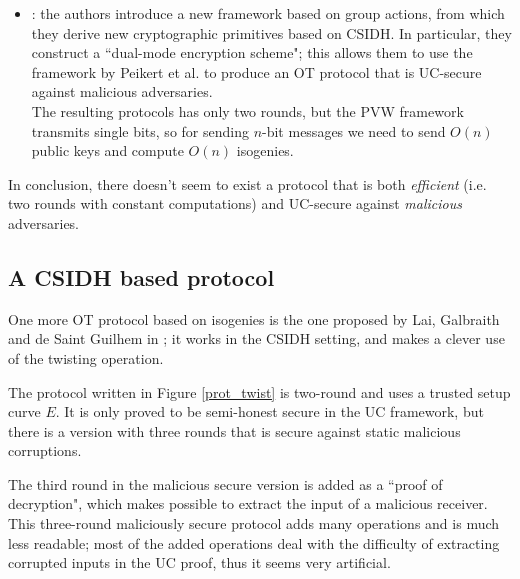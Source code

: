 \begin{itemize}
    \item \cite{Alamati}: the authors introduce a new framework based on group actions, from which they derive new cryptographic primitives based on CSIDH. In particular, they construct a ``dual-mode encryption scheme"; this allows them to use the framework by Peikert et al. \cite{PVW} to produce an OT protocol that is UC-secure against malicious adversaries.\\
    The resulting protocols has only two rounds, but the PVW framework transmits single bits, so for sending $n$-bit messages we need to send $O(n)$ public keys and compute $O(n)$ isogenies.
\end{itemize}

In conclusion, there doesn't seem to exist a protocol that is both \emph{efficient} (i.e. two rounds with constant computations) and UC-secure against \emph{malicious} adversaries.

\subsection{A CSIDH based protocol}
One more OT protocol based on isogenies is the one proposed by Lai, Galbraith and de Saint Guilhem in \cite{Lai_twists}; it works in the CSIDH setting, and makes a clever use of the twisting operation.

The protocol written in Figure \ref{prot_twist} is two-round and uses a trusted setup curve $E$. It is only proved to be semi-honest secure in the UC framework, but there is a version with three rounds that is secure against static malicious corruptions.

The third round in the malicious secure version is added as a ``proof of decryption", which makes possible to extract the input of a malicious receiver. This three-round maliciously secure protocol adds many operations and is much less readable; most of the added operations deal with the difficulty of extracting corrupted inputs in the UC proof, thus it seems very artificial.


